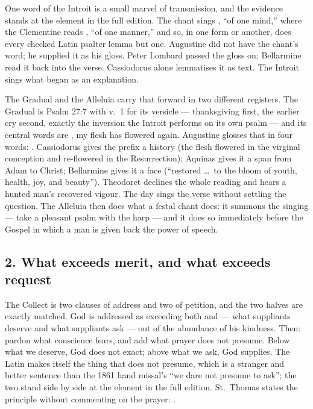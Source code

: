 One word of the Introit is a small marvel of transmission, and the evidence
stands at the element in the full edition. The chant sings ,
``of one mind,'' where the Clementine reads , ``of one
manner,'' and so, in one form or another, does every checked Latin psalter lemma
but one.
Augustine did not have the chant's word; he supplied it as his gloss. Peter
Lombard passed the gloss on; Bellarmine read it back into the verse.
Cassiodorus alone lemmatises it as text. The Introit sings what began as an
explanation.

The Gradual and the Alleluia carry that forward in two different registers.
The Gradual is Psalm 27:7 with v.~1 for its versicle --- thanksgiving first,
the earlier cry second, exactly the inversion the Introit performs on its own
psalm --- and its central words are , my flesh has
flowered again. Augustine glosses that in four words: . Cassiodorus gives the prefix a history (the flesh
flowered in the virginal conception and re-flowered in the Resurrection);
Aquinas gives it a span from Adam to Christ; Bellarmine gives it a face
(``restored \dots\ to the bloom of youth, health, joy, and beauty''). Theodoret
declines the whole reading and hears a hunted man's recovered vigour. The day
sings the verse without settling the question. The Alleluia then does what a
festal chant does: it summons the singing --- take a pleasant psalm with the
harp --- and it does so immediately before the Gospel in which a man is given
back the power of speech.

\subsection*{2. What exceeds merit, and what exceeds request}

The Collect is two clauses of address and two of petition, and the two halves
are exactly matched. God is addressed as exceeding both  and
 --- what suppliants deserve and what suppliants ask --- out of the
abundance of his kindness. Then: pardon what conscience fears, and add what
prayer does not presume. Below what we deserve, God does not exact; above what
we ask, God supplies. The Latin makes  itself the thing that does
not presume, which is a stranger and better sentence than the 1861 hand
missal's ``we dare not presume to ask''; the two stand side by side at the
element in the full edition. St.~Thomas states the principle without commenting on the prayer:
.

